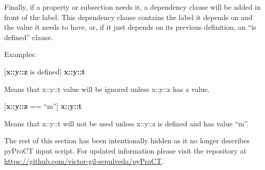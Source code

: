 Finally, if a property or subsection needs it, a dependency clause
will be added in front of the label. This dependency clause contains
the label it depends on and the value it needs to have, or, if it
just depends on its previous definition, an ``is defined\textquotedblright{}
clause.

Examples:

{[}\textbf{x::y::z} is defined{]} \textbf{x::y::t}

Means that x::y::t value will be ignored unless x::y::z has a value.

{[}\textbf{x::y::z} == ``m\textquotedblright {]} \textbf{x::y::t}

Means that x::y::t will not be used unless x::y::z is defined and
has value ``m\textquotedblright .

\begin{framed}
The rest of this section has been intentionally hidden as it no longer describes pyProCT input script. For 
updated information please visit the repository at \url{https://github.com/victor-gil-sepulveda/pyProCT}.
\end{framed}

